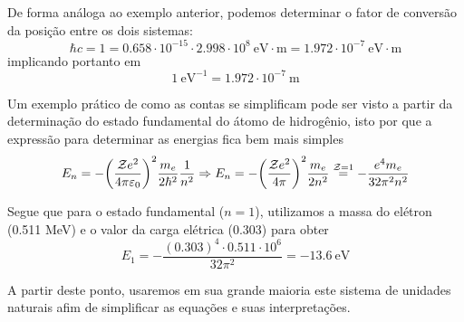     \begin{example}
        De forma análoga ao exemplo anterior, podemos determinar o fator de conversão da posição entre os dois sistemas:
            \begin{equation*}
                \hbar c = 1 = 0.658\cdot 10^{-15} \cdot 2.998\cdot 10^{8}\ \mathrm{eV\cdot m} = 1.972 \cdot 10^{-7}\ \mathrm{eV\cdot m}
            \end{equation*}
        implicando portanto em
            \begin{equation*}
                1\ \text{eV}^{-1} = 1.972\cdot 10^{-7}\ \text{m}
            \end{equation*}
    \end{example}

    \begin{example}
        Um exemplo prático de como as contas se simplificam pode ser visto a partir da determinação do estado fundamental do átomo de hidrogênio, isto por que a expressão para determinar as energias fica bem mais simples
            \begin{equation*}
                E_{n} = -\qty(\dfrac{\mathcal{Z}e^2}{4\pi\varepsilon_{0}})^2\dfrac{m_{e}}{2\hbar^2}\dfrac{1}{n^2} \Rightarrow E_{n} = -\qty(\dfrac{\mathcal{Z}e^2}{4\pi})^2\dfrac{m_{e}}{2n^2} \overset{\mathcal{Z}=1}{=} -\dfrac{e^4 m_{e}}{32\pi^2n^2}
            \end{equation*}

        Segue que para o estado fundamental ($n=1$), utilizamos a massa do elétron (0.511 MeV) e o valor da carga elétrica (0.303) para obter
            \begin{equation*}
                E_{1} = -\dfrac{(0.303)^4 \cdot 0.511 \cdot 10^{6}}{32 \pi^2} = -13.6\ \text{eV}
            \end{equation*}
    \end{example}

    A partir deste ponto, usaremos em sua grande maioria este sistema de unidades naturais afim de simplificar as equações e suas interpretações.